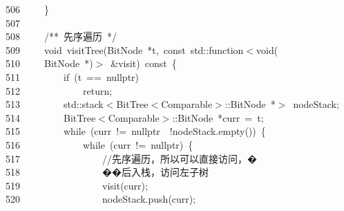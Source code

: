 \documentclass[11pt,a4paper]{ctexart}
\newcommand{\hlstd}[1]{\textcolor[rgb]{0.2,0.2,0.2}{#1}}
\newcommand{\hlslc}[1]{\textcolor[rgb]{0.59,0.59,0.59}{#1}}
\newcommand{\hlcom}[1]{\textcolor[rgb]{0.59,0.59,0.59}{#1}}
\newcommand{\hlopt}[1]{\textcolor[rgb]{0.2,0.2,0.2}{#1}}
\newcommand{\hllin}[1]{\textcolor[rgb]{0.59,0.59,0.59}{#1}}
\newcommand{\hlkwa}[1]{\textcolor[rgb]{0.23,0.42,0.78}{#1}}
\newcommand{\hlkwb}[1]{\textcolor[rgb]{0.63,0,0.31}{#1}}
\newcommand{\hlkwc}[1]{\textcolor[rgb]{0,0.63,0.31}{#1}}
\newcommand{\hlkwd}[1]{\textcolor[rgb]{0.78,0.23,0.41}{#1}}
\begin{document}
\hllin{506\ }\hlstd{}\hlstd{\ \ \ \ }\hlstd{}\hlopt{\}}\\
\hllin{507\ }\hlstd{}\\
\hllin{508\ }\hlstd{}\hlstd{\ \ \ \ }\hlstd{}\hlcom{/{*}{*}\ 先序遍历\ {*}/}\hlstd{}\\
\hllin{509\ }\hlstd{}\hlstd{\ \ \ \ }\hlstd{}\hlkwb{void\ }\hlstd{}\hlkwd{visitTree}\hlstd{}\hlopt{(}\hlstd{BitNode\ }\hlopt{{*}}\hlstd{t}\hlopt{,\ }\hlstd{}\hlkwb{const\ }\hlstd{}\hlkwc{std}\hlstd{}\hlopt{::}\hlstd{function}\hlopt{$<$}\hlstd{}\hlkwb{void}\hlstd{}\hlopt{(}\Righttorque\\
\hllin{510\ }\hlstd{}\hlstd{\ \ \ \ }\hlstd{BitNode\ }\hlopt{{*})$>$\ \&}\hlstd{visit}\hlopt{)\ }\hlstd{}\hlkwb{const\ }\hlstd{}\hlopt{\{}\\
\hllin{511\ }\hlstd{}\hlstd{\ \ \ \ \ \ \ \ }\hlstd{}\hlkwa{if\ }\hlstd{}\hlopt{(}\hlstd{t\ }\hlopt{==\ }\hlstd{}\hlkwc{nullptr}\hlstd{}\hlopt{)}\\
\hllin{512\ }\hlstd{}\hlstd{\ \ \ \ \ \ \ \ \ \ \ \ }\hlstd{}\hlkwa{return}\hlstd{}\hlopt{;}\\
\hllin{513\ }\hlstd{}\hlstd{\ \ \ \ \ \ \ \ }\hlstd{}\hlkwc{std}\hlstd{}\hlopt{::}\hlstd{stack}\hlopt{$<$}\hlstd{BitTree}\hlopt{$<$}\hlstd{Comparable}\hlopt{$>$::}\hlstd{BitNode\ }\hlopt{{*}$>$\ }\hlstd{nodeStack}\hlopt{;}\\
\hllin{514\ }\hlstd{}\hlstd{\ \ \ \ \ \ \ \ }\hlstd{BitTree}\hlopt{$<$}\hlstd{Comparable}\hlopt{$>$::}\hlstd{BitNode\ }\hlopt{{*}}\hlstd{curr\ }\hlopt{=\ }\hlstd{t}\hlopt{;}\\
\hllin{515\ }\hlstd{}\hlstd{\ \ \ \ \ \ \ \ }\hlstd{}\hlkwa{while\ }\hlstd{}\hlopt{(}\hlstd{curr\ }\hlopt{!=\ }\hlstd{}\hlkwc{nullptr\ }\hlstd{}\hlopt{\textbar \textbar \ !}\hlstd{nodeStack}\hlopt{.}\hlstd{}\hlkwd{empty}\hlstd{}\hlopt{())\ \{}\\
\hllin{516\ }\hlstd{}\hlstd{\ \ \ \ \ \ \ \ \ \ \ \ }\hlstd{}\hlkwa{while\ }\hlstd{}\hlopt{(}\hlstd{curr\ }\hlopt{!=\ }\hlstd{}\hlkwc{nullptr}\hlstd{}\hlopt{)\ \{}\\
\hllin{517\ }\hlstd{}\hlstd{\ \ \ \ \ \ \ \ \ \ \ \ \ \ \ \ }\hlstd{}\hlslc{//先序遍历，所以可以直接访问，�}\Righttorque\\
\hllin{518\ }\hlslc{}\hlstd{\ \ \ \ \ \ \ \ \ \ \ \ \ \ \ \ }\hlslc{��后入栈，访问左子树}\\
\hllin{519\ }\hlstd{}\hlstd{\ \ \ \ \ \ \ \ \ \ \ \ \ \ \ \ }\hlstd{}\hlkwd{visit}\hlstd{}\hlopt{(}\hlstd{curr}\hlopt{);}\\
\hllin{520\ }\hlstd{}\hlstd{\ \ \ \ \ \ \ \ \ \ \ \ \ \ \ \ }\hlstd{nodeStack}\hlopt{.}\hlstd{}\hlkwd{push}\hlstd{}\hlopt{(}\hlstd{curr}\hlopt{);}\\
\end{document}
